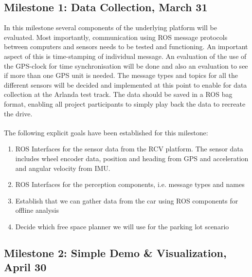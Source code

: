 \documentclass[11pt,a4paper]{article}
\begin{document}
\subsection{Milestone 1: Data Collection, March 31}
\label{milestone1}

In this milestone several components of the underlying platform will be evaluated.
Most importantly, communication using ROS message protocols between computers and sensors needs to be tested and functioning.
An important aspect of this is time-stamping
of individual message. An evaluation of the use of the GPS-clock for time synchronisation will be done and also an evaluation to see if more than one GPS unit is needed.
The message types and topics for all the different sensors
will be decided and implemented at this point to enable for data collection at the Arlanda test track. The data should be saved in a ROS bag format, enabling
all project participants to simply play back the data to recreate the drive. \\ \\
The following explicit goals have been established for this milestone:
\begin{enumerate}
\item ROS Interfaces for the sensor data from the RCV platform. The sensor data includes wheel encoder data, position and heading from GPS and acceleration and angular velocity from IMU.
\item ROS Interfaces for the perception components, i.e. message types and names
\item Establish that we can gather data from the car using ROS components for offline analysis
\item Decide which free space planner we will use for the parking lot scenario
\end{enumerate}

\subsection{Milestone 2: Simple Demo \& Visualization, April 30}
\label{milestone2}
\end{document}
